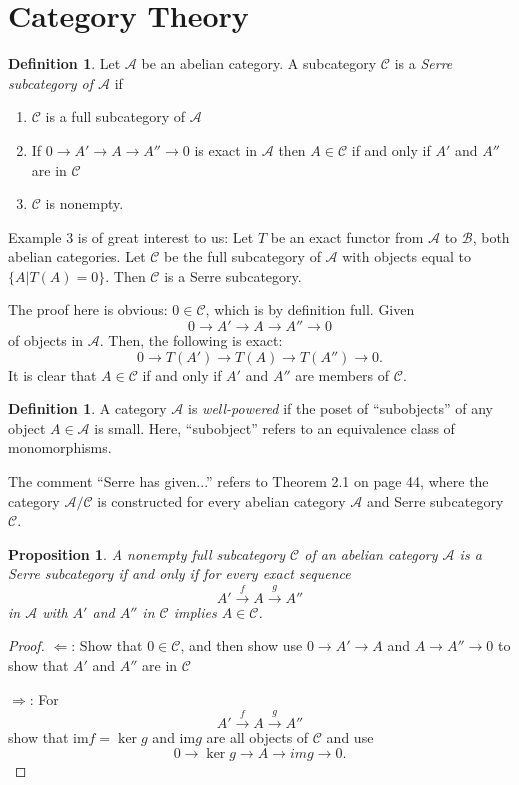 \documentclass[11pt]{amsart}
\numberwithin{equation}{section}
\theoremstyle{plain} %
\newtheorem{prop}[equation]{Proposition}
\theoremstyle{definition}
\newtheorem{definition}[equation]{Definition}
\newcommand{\Cat}[1]{\mathcal{#1}}
\newcommand{\im}{\mathrm{im}}
\renewcommand{\to}{\longrightarrow}
\begin{document}
\section{Category Theory}

\begin{definition} 
Let $\Cat{A}$ be an abelian category. A subcategory
$\Cat{C}$ is a \emph{Serre subcategory of $\Cat{A}$}
if
\begin{enumerate}
\item $\Cat{C}$ is a full subcategory of $\Cat{A}$

\item If $0 \to A' \to A \to A''\to 0$ is exact in $\Cat{A}$
then $A \in \Cat{C}$ if and only if $A'$ and $A''$ are in
$\Cat{C}$

\item $\Cat{C}$ is nonempty.
\end{enumerate}
\end{definition}

Example 3 is of great interest to us: Let $T$ be an exact
functor from $\Cat{A}$ to $\Cat{B}$, both abelian categories.
Let $\Cat{C}$ be the full subcategory of $\Cat{A}$ with objects
equal to $\{A | T(A) = 0\}$. Then $\Cat{C}$ is a Serre 
subcategory.

The proof here is obvious: $0 \in \Cat{C}$, which is by 
definition full. Given
\[
0 \to A' \to A \to A'' \to 0
\]
of objects in $\Cat{A}$. Then, the following is exact:
\[
0 \to T(A') \to T(A) \to T(A'') \to 0.
\]
It is clear that $A \in \Cat{C}$ if and only if $A'$ and
$A''$ are members of $\Cat{C}$.

\begin{definition}
A category $\Cat{A}$ is \emph{well-powered} if the poset
of ``subobjects'' of any object $A \in \Cat{A}$ is small.
Here, ``subobject'' refers to an equivalence class of
monomorphisms.
\end{definition}

The comment ``Serre has given...'' refers to Theorem 2.1 on
page 44, where the category $\Cat{A}/\Cat{C}$ is constructed
for every abelian category $\Cat{A}$ and Serre subcategory
$\Cat{C}$.

\begin{prop}
A nonempty full subcategory $\Cat{C}$ of an abelian category
$\Cat{A}$ is a Serre subcategory if and only if for every
exact sequence
\[
A' \stackrel{f}{\to} A \stackrel{g}{\to} A''
\]
in $\Cat{A}$ with $A'$ and $A''$ in $\Cat{C}$ implies
$A \in \Cat{C}$.
\end{prop}
\begin{proof}
\noindent$\Leftarrow$: Show that $0 \in \Cat{C}$, and then show
use $0 \to A' \to A$ and $A \to A'' \to 0$ to show that $A'$
and $A''$ are in $\Cat{C}$

\noindent$\Rightarrow$: For
\[
A' \stackrel{f}{\to} A \stackrel{g}{\to} A''
\]
show that $\im f = \ker g$ and $\im g$ are all
objects of $\Cat{C}$ and use
\[
0 \to \ker g \to A \to im g \to 0.
\]
\end{proof}
\end{document}
